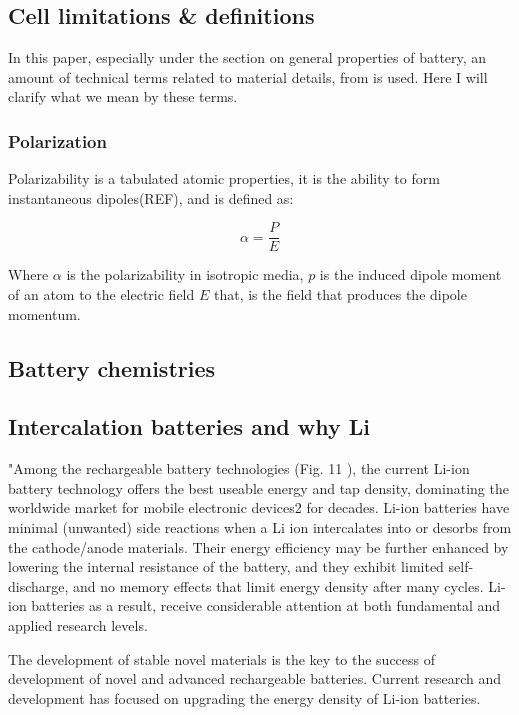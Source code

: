 \subsection{Cell limitations \& definitions }
In this paper, especially under the section on general properties of battery, an amount of technical terms related to material details, from  is used. Here I will clarify what we mean by these terms. 

	
	
	\subsubsection{Polarization}
	Polarizability is a tabulated atomic properties, it is the ability to form instantaneous dipoles(REF), and is defined as: 
	
	$$	\alpha = \frac{P}{E}	$$
	
	Where $\alpha $ is the polarizability in isotropic media, $p$ is the induced dipole moment of an atom to the electric field $E$ that, is the field that produces the dipole momentum. 
	
 



		



\subsection{Battery chemistries}

\subsection{Intercalation batteries and why Li}

"Among the rechargeable battery technologies (Fig. 11
), the
current Li-ion battery technology offers the best useable energy
and tap density, dominating the worldwide market for mobile
electronic devices2 for decades. Li-ion batteries have minimal
(unwanted) side reactions when a Li ion intercalates into or
desorbs from the cathode/anode materials. Their energy efficiency
may be further enhanced by lowering the internal resistance of the
battery, and they exhibit limited self-discharge, and no memory
effects that limit energy density after many cycles. Li-ion batteries
as a result, receive considerable attention at both fundamental and
applied research levels.


The development
of stable novel materials is the key to the success of development
of novel and advanced rechargeable batteries. Current research
and development has focused on upgrading the energy density
of Li-ion batteries. 

